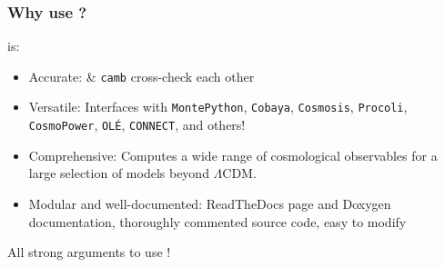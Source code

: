 \begin{frame}[fragile]
	\frametitle{Why use \CLASS{}?}
	\CLASS{} is:
	\vspace{0.5\baselineskip}
	\begin{itemize}
		\item Accurate: \CLASS{} \& \texttt{camb} cross-check each other
		\item Versatile: Interfaces with \texttt{MontePython}, \texttt{Cobaya}, \texttt{Cosmosis}, \texttt{Procoli}, \texttt{CosmoPower}, \texttt{OL\'E}, \texttt{CONNECT}, and others!
		\item Comprehensive: Computes a wide range of cosmological observables for a large selection of models beyond $\Lambda$CDM.
		\item Modular and well-documented: ReadTheDocs page and Doxygen documentation, thoroughly commented source code, easy to modify
	\end{itemize}
	All strong arguments to use {\Red \CLASS{}}!\\

\end{frame}

